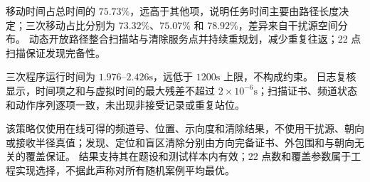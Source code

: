 移动时间占总时间的 $75.73\%$，远高于其他项，说明任务时间主要由路径长度决定；三次移动占比分别为 $73.32\%$、$75.07\%$ 和 $78.92\%$，差异来自干扰源空间分布。
动态开放路径整合扫描站与清除服务点并持续重规划，减少重复往返；22 点扫描保证发现完备性。

三次程序运行时间为 $1.976$--$2.426\mathrm{s}$，远低于 $1200\mathrm{s}$ 上限，不构成约束。
日志复核显示，时间项之和与虚拟时间的最大残差不超过 $2\times10^{-6}\mathrm{s}$；扫描证书、频道状态和动作序列逐项一致，未出现非接受记录或重复站位。

该策略仅使用在线可得的频道号、位置、示向度和清除结果，不使用干扰源、朝向或接收半径真值；发现、定位和盲区清除分别由方向完备证书、外包围和与朝向无关的覆盖保证。
结果支持其在题设和测试样本内有效；22 点数和覆盖参数属于工程实现选择，不据此声称对所有随机案例平均最优。

